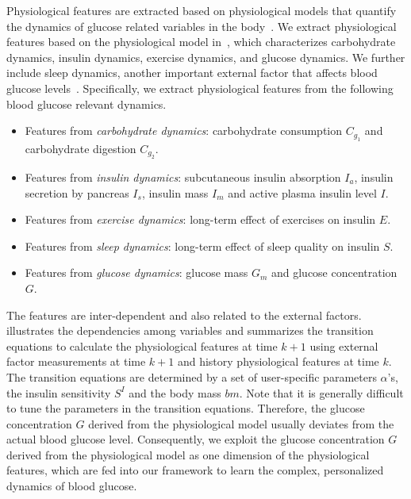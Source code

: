 Physiological features are extracted based on physiological models that quantify the dynamics of glucose related variables in the body~\cite{bib:duke2010intelligent, bib:MAIHA14:Plis}.
We extract physiological features based on the physiological model in~\cite{bib:duke2010intelligent}, which characterizes carbohydrate dynamics, insulin dynamics, exercise dynamics, and glucose dynamics.
We further include sleep dynamics, another important external factor that affects blood glucose levels~\cite{bib:DRCP15:Iwasaki}.
Specifically, we extract physiological features from the following blood glucose relevant dynamics.
\begin{itemize}
  \item
  Features from \emph{carbohydrate dynamics}:
  carbohydrate consumption $C_{g_1}$ and carbohydrate digestion $C_{g_2}$.
  \item
  Features from \emph{insulin dynamics}:
  subcutaneous insulin absorption $I_{a}$, insulin secretion by pancreas $I_{s}$, insulin mass $I_{m}$ and active plasma insulin level $I$.
  \item
  Features from \emph{exercise dynamics}:
  long-term effect of exercises on insulin $E$.
  \item
  Features from \emph{sleep dynamics}:
  long-term effect of sleep quality on insulin $S$.
  \item
  Features from \emph{glucose dynamics}:
  glucose mass $G_m$ and glucose concentration $G$.
\end{itemize}
The features are inter-dependent and also related to the external factors.
 illustrates the dependencies among variables and  summarizes the transition equations to calculate the physiological features at time $k+1$ using external factor measurements at time $k+1$ and history physiological features at time $k$.
The transition equations are determined by a set of user-specific parameters $\alpha$'s, the insulin sensitivity $S^I$ and the body mass $bm$.
Note that it is generally difficult to tune the parameters in the transition equations.
Therefore, the glucose concentration $G$ derived from the physiological model usually deviates from the actual blood glucose level.
Consequently, we exploit the glucose concentration $G$ derived from the physiological model as one dimension of the physiological features, which are fed into our \modelname framework to learn the complex, personalized dynamics of blood glucose.

%

